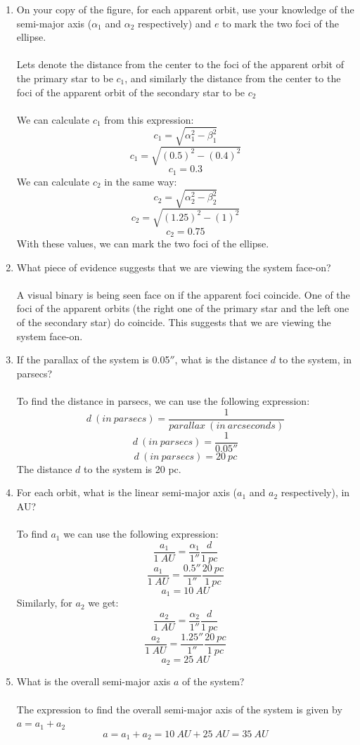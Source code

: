 \documentclass[10pt]{article}
\begin{document}
\begin{enumerate} [label=(\alph*)]
    \item On your copy of the figure, for each apparent orbit, use your knowledge of the semi-major axis ($\alpha_{1}$ and $\alpha_{2}$ respectively) and $e$ to mark the two foci of the ellipse. \\ \\
    Lets denote the distance from the center to the foci of the apparent orbit of the primary star to be $c_{1}$, and similarly the distance from the center to the foci of the apparent orbit of the secondary star to be $c_{2}$ \\ \\
    We can calculate $c_{1}$ from this expression:
    \[ c_{1} = \sqrt{\alpha_{1}^{2} - \beta_{1}^{2}}\]
    \[ c_{1} = \sqrt{ (0.5)^{2} - (0.4)^{2}}\]
    \[ c_{1} = 0.3\]
    We can calculate $c_{2}$ in the same way:
    \[ c_{2} = \sqrt{\alpha_{2}^{2} - \beta_{2}^{2}}\]
    \[ c_{2} = \sqrt{ (1.25)^{2} - (1)^{2}}\]
    \[ c_{2} = 0.75\]
    With these values, we can mark the two foci of the ellipse.

    \item What piece of evidence suggests that we are viewing the system face-on? \\ \\
    A visual binary is being seen face on if the apparent foci coincide. One of the foci of the apparent orbits (the right one of the primary star and the left one of the secondary star) do coincide. This suggests that we are viewing the system face-on.

    \item If the parallax of the system is 0.05$''$, what is the distance $d$ to the system, in parsecs? \\ \\
    To find the distance in parsecs, we can use the following expression:
    \[ d  \ (in  \ parsecs) = \frac{1}{parallax  \ (in \  arcseconds)}\]
    \[ d  \  (in \  parsecs ) = \frac{1}{0.05''}\]
    \[ d  \  (in \  parsecs ) = 20  \ pc \]
    The distance $d$ to the system is 20 pc.

    \item For each orbit, what is the linear semi-major axis ($a_{1}$ and $a_{2}$ respectively), in AU? \\ \\
    To find $a_{1}$ we can use the following expression:
    \[ \frac{a_{1}}{1 \ AU} = \frac{\alpha_{1}}{1 ''} \frac{d}{1 \  pc}\]
    \[ \frac{a_{1}}{1 \ AU} = \frac{0.5 ''}{1''} \frac{20 \ pc}{1 \ pc}\]
    \[ a_{1} = 10 \ AU\]
    Similarly, for $a_{2}$ we get:
    \[ \frac{a_{2}}{1 \ AU} = \frac{\alpha_{2}}{1 ''} \frac{d}{1 \  pc} \]
    \[ \frac{a_{2}}{1 \ AU} = \frac{1.25 ''}{1''} \frac{20 \ pc}{1 \ pc}\]
    \[ a_{2} = 25 \ AU\]
    \item What is the overall semi-major axis $a$ of the system? \\ \\
    The expression to find the overall semi-major axis of the system is given by $a = a_{1} + a_{2}$
    \[ a = a_{1} + a_{2} = 10 \ AU + 25 \ AU = 35 \ AU\]


\end{enumerate}
\end{document}
